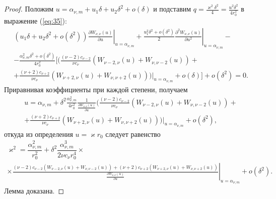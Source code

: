\begin{proof}
Положим $u = \alpha_{\nu, m} + u_1 \delta + u_2 \delta^2 + o(\delta)$ и подставим $q = \frac{\varkappa^2 \delta^2}{4} = \frac{u^2 \delta^2}{4 r_0^2}$ в выражение (\ref{eq:35}):
\begin{multline*}
    (u_1 \delta + u_2 \delta^2 + o(\delta^2)) 
\left.
\frac{\partial W_{\nu, \nu}(u)}{\partial u}
\right|_{u=\alpha_{\nu, m}} + 
\left.
\frac{u_1^2\delta^2 + o(\delta^2)}{2}
\frac{\partial^2 W_{\nu, \nu}(u)}{\partial u^2}
\right|_{u=\alpha_{\nu, m}} - \\
-	\frac{\alpha_{\nu, m}^2 \delta^2 + o(\delta^2)}{4r_0^2}
\bigg[
\bigg(  \frac{(\nu-2) c_{\nu-2}}{\nu c_\nu} 
	\left(
	W_{\nu-2, \nu}(u) + W_{\nu, \nu-2}(u)
	\right)+ \\
	    + \frac{(\nu+2) c_{\nu+2}}{\nu c_\nu} 
	\left(
	W_{\nu+2, \nu}(u) + W_{\nu, \nu+2}(u)
	\right)
\left.
\bigg)
\right|_{u=\alpha_{\nu, m}}
+o(\delta)
\bigg]
 + o(\delta^2) = 0.
\end{multline*}
Приравнивая коэффициенты при каждой степени, получаем  
\begin{multline*}
    u = \alpha_{\nu, m} + \delta^2 \frac{\alpha_{\nu, m}^2}{4r_0^2} \frac{1}{\frac{\partial W_{\nu,\nu}(u)}{\partial u}}
\bigg(    
	\frac{(\nu-2) c_{\nu-2}}{\nu c_\nu} 
	\left(
	W_{\nu-2, \nu}(u) + W_{\nu, \nu-2}(u)
	\right)+ \\
	    + \frac{(\nu+2) c_{\nu+2}}{\nu c_\nu} 
	\left(
	W_{\nu+2, \nu}(u) + W_{\nu, \nu+2}(u)
	\right)
\left.
\bigg)
\right|_{u=\alpha_{\nu, m}} + o(\delta^2),
\end{multline*}
откуда из определения $u = \varkappa r_0$ следует равенство
{\small
\begin{multline*}
\varkappa^2 = \dfrac{\alpha_{\nu, m}^2}{r_0^2} + \delta^2 \dfrac{\alpha_{\nu, m}^3}{2 \nu c_\nu r_0^4} \times \\ \times \left. \frac{
	(\nu-2) c_{\nu-2}
	\left(
	W_{\nu-2, \nu}(u) + W_{\nu, \nu-2}(u)
	\right)+ 
    (\nu+2) c_{\nu+2}
	\left(
	W_{\nu+2, \nu}(u) + W_{\nu, \nu+2}(u)
	\right)
}{ \frac{\partial W_{\nu,\nu}(u)}{\partial u} }\right|_{u=\alpha_{\nu, m}} + o(\delta^2).
\end{multline*}
}
Лемма доказана.
\end{proof}

